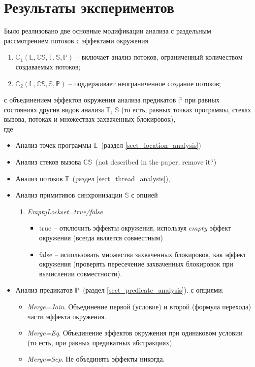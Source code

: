 \chapter{Результаты экспериментов}
\label{chapter_evaluation}

Было реализовано две основные модификации анализа с раздельным рассмотрением потоков с эффектами окружения
\begin{enumerate}
\item $\mathbb{C_1}(\mathbb{L}, \mathbb{CS}, \mathbb{T}, \mathbb{S}, \mathbb{P})$ -- включает анализ потоков, ограниченный количеством создаваемых потоков;
\item $\mathbb{C_2}(\mathbb{L}, \mathbb{CS}, \mathbb{S}, \mathbb{P})$ -- поддерживает неограниченное создание потоков;
\end{enumerate}
с объединением эффектов окружения анализа предикатов $\mathbb{P}$ при равных состояниях другив видов анализа $\mathbb{T}$, $\mathbb{S}$
(то есть, равных точках программы, стеках вызова, потоках и множествах захваченных блокировок),\\
где
\begin{itemize}
\item Анализ точек программы $\mathbb{L}$~(раздел \ref{sect_location_analysis})
\item Анализ стеков вызова $\mathbb{CS}$~(not described in the paper, remove it?)
\item Анализ потоков $\mathbb{T}$~(раздел \ref{sect_thread_analysis}),
\item Анализ примитивов синхронизации $\mathbb{S}$%
с опцией 
\begin{enumerate}
\item {\em EmptyLockset=true/false}
\begin{itemize}
\item true -- отключить эффекты окружения, используя $empty$ эффект окружения (всегда является совместным)
\item false -- использовать множества захваченных блокировок, как эффект окружения (проверять пересечение захваченных блокировок при вычислении совместности).
\end{itemize}
\end{enumerate}

\item Анализ предикатов $\mathbb{P}$~(раздел \ref{sect_predicate_analysis}).
с опциями:
\begin{itemize}
\item {\em Merge=Join}. Объединение первой (условие) и второй (формула перехода) части эффекта окружения.
\item {\em Merge=Eq}. Объединение эффектов окружения при одинаковом условии (то есть, при равных предикатных абстракциях).
\item {\em Merge=Sep}. Не объединять эффекты никогда.
\end{itemize}
\end{itemize}

